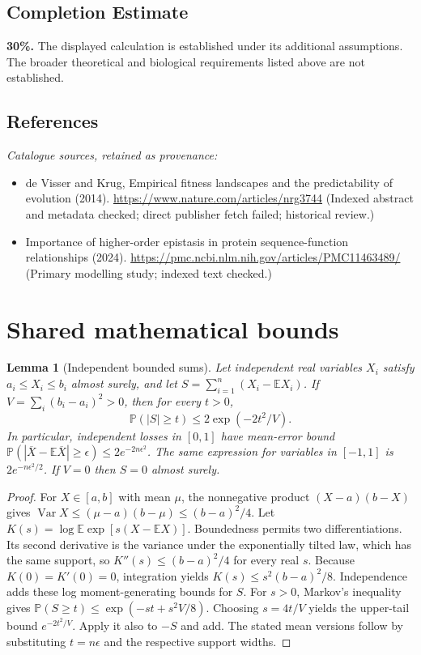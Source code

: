 \documentclass[11pt]{article}
\newcommand{\E}{\mathbb E}
\newcommand{\Prob}{\mathbb P}
\DeclareMathOperator{\Var}{Var}
\providecommand{\E}{\mathbb E}
\providecommand{\Prob}{\mathbb P}
\providecommand{\Var}{\operatorname{Var}}
\newtheorem{sharedlemma}{Lemma}[section]
\begin{document}
\subsection{Completion Estimate}
\textbf{30\%.} The displayed calculation is established under its additional assumptions. The broader theoretical and biological requirements listed above are not established.
\subsection{References}
\noindent\emph{Catalogue sources, retained as provenance:}
\begin{itemize}
\item de Visser and Krug, Empirical fitness landscapes and the predictability of evolution (2014). \url{https://www.nature.com/articles/nrg3744} (Indexed abstract and metadata checked; direct publisher fetch failed; historical review.)
\item Importance of higher-order epistasis in protein sequence-function relationships (2024). \url{https://pmc.ncbi.nlm.nih.gov/articles/PMC11463489/} (Primary modelling study; indexed text checked.)
\end{itemize}
\clearpage


\appendix
\section{Shared mathematical bounds}\label{app:bounds}
\begin{sharedlemma}[Independent bounded sums]\label{lem:bounded}
Let independent real variables $X_i$ satisfy $a_i\leq X_i\leq b_i$ almost surely,
and let $S=\sum_{i=1}^n(X_i-\E X_i)$. If
$V=\sum_i(b_i-a_i)^2>0$, then for every $t>0$,
\[
 \Prob(|S|\geq t)\leq 2\exp(-2t^2/V).
\]
In particular, independent losses in $[0,1]$ have mean-error bound
$\Prob(|\overline X-\E\overline X|\geq\epsilon)
\leq2e^{-2n\epsilon^2}$. The same expression for variables in $[-1,1]$
is $2e^{-n\epsilon^2/2}$. If $V=0$ then $S=0$ almost surely.
\end{sharedlemma}
\begin{proof}
For $X\in[a,b]$ with mean $\mu$, the nonnegative product
$(X-a)(b-X)$ gives
$\Var X\leq(\mu-a)(b-\mu)\leq(b-a)^2/4$.
Let $K(s)=\log\E\exp[s(X-\E X)]$.
Boundedness permits two differentiations. Its second derivative is the variance
under the exponentially tilted law, which has the same support, so
$K''(s)\leq(b-a)^2/4$ for every real $s$.
Because $K(0)=K'(0)=0$, integration yields
$K(s)\leq s^2(b-a)^2/8$.
Independence adds these log moment-generating bounds for $S$.
For $s>0$, Markov's inequality gives
$\Prob(S\geq t)\leq\exp(-st+s^2V/8)$.
Choosing $s=4t/V$ yields the upper-tail bound $e^{-2t^2/V}$.
Apply it also to $-S$ and add. The stated mean versions follow by substituting
$t=n\epsilon$ and the respective support widths.
\end{proof}
\end{document}
